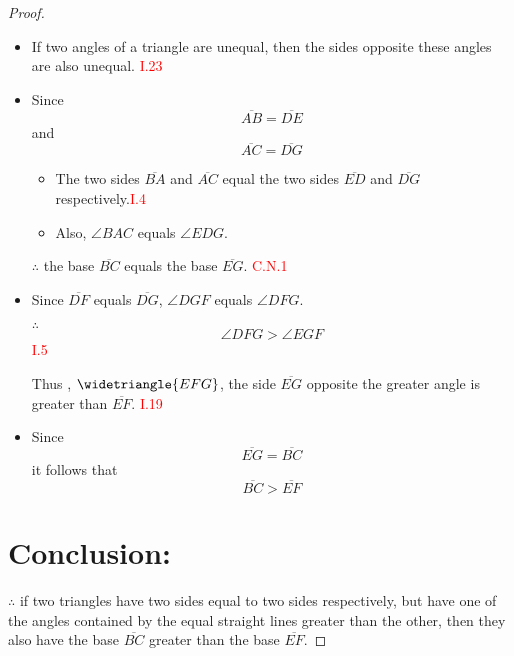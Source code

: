 \begin{proof}

\begin{itemize}
    	\item If two angles of a triangle are unequal, then the sides opposite these angles are also unequal.\hfill\textcolor{red}{ I.23}
    
  	\item Since 
  	\[\overline{AB} = \overline{DE}\] 
  	and
  	\[ \overline{AC} = \overline{DG}\]
	\begin{itemize}
            	\item The two sides $\overline{BA}$ and $\overline{AC}$ equal the two sides $\overline{ED}$ and $\overline{DG}$ respectively.\hfill\textcolor{red}{I.4}
            	
            	\item Also, $\angle{BAC}$ equals $\angle{EDG}$.
        \end{itemize}
    	\item[$\therefore$] the base $\overline{BC}$ equals the base $\overline{EG}$. \hfill\textcolor{red}{C.N.1}
    	
    		\item Since $\overline{DF}$ equals $\overline{DG}$, $\angle{DGF}$ equals $\angle{DFG}$.
    		
    		\item[$\therefore$] 
    		\[\angle{DFG} > \angle{EGF}\]\hfill\textcolor{red}{ I.5}

\clearpage
    		
    		\item[Thus], $\widetriangle{EFG}$, the side $\overline{EG}$ opposite the greater angle is greater than $\overline{EF}$.\hfill\textcolor{red}{ I.19}
    		
    		\item Since 
    		\[\overline{EG} = \overline{BC}\] 
    		it follows that 
    		\[\overline{BC} > \overline{EF}\]
\end{itemize}

\section*{Conclusion:}
$\therefore$ if two triangles have two sides equal to two sides respectively, but have one of the angles contained by the equal straight lines greater than the other, then they also have the base $\overline{BC}$ greater than the base $\overline{EF}$.

\end{proof}

\clearpage
